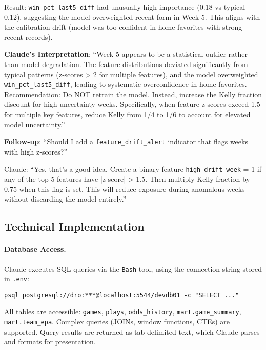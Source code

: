 Result: \texttt{win\_pct\_last5\_diff} had unusually high importance (0.18 vs typical 0.12), suggesting the model overweighted recent form in Week 5. This aligns with the calibration drift (model was too confident in home favorites with strong recent records).

\textbf{Claude's Interpretation}: ``Week 5 appears to be a statistical outlier rather than model degradation. The feature distributions deviated significantly from typical patterns (z‑scores > 2 for multiple features), and the model overweighted \texttt{win\_pct\_last5\_diff}, leading to systematic overconfidence in home favorites. Recommendation: Do NOT retrain the model. Instead, increase the Kelly fraction discount for high‑uncertainty weeks. Specifically, when feature z‑scores exceed 1.5 for multiple key features, reduce Kelly from 1/4 to 1/6 to account for elevated model uncertainty.''

\textbf{Follow‑up}: ``Should I add a \texttt{feature\_drift\_alert} indicator that flags weeks with high z‑scores?''

Claude: ``Yes, that's a good idea. Create a binary feature \texttt{high\_drift\_week} = 1 if any of the top 5 features have |z‑score| > 1.5. Then multiply Kelly fraction by 0.75 when this flag is set. This will reduce exposure during anomalous weeks without discarding the model entirely.''

\subsection{Technical Implementation}
\label{subsec:technical_implementation}

\paragraph{Database Access.}
Claude executes SQL queries via the \texttt{Bash} tool, using the connection string stored in \texttt{.env}:
\begin{verbatim}
psql postgresql://dro:***@localhost:5544/devdb01 -c "SELECT ..."
\end{verbatim}
All tables are accessible: \texttt{games}, \texttt{plays}, \texttt{odds\_history}, \texttt{mart.game\_summary}, \texttt{mart.team\_epa}. Complex queries (JOINs, window functions, CTEs) are supported. Query results are returned as tab‑delimited text, which Claude parses and formats for presentation.

